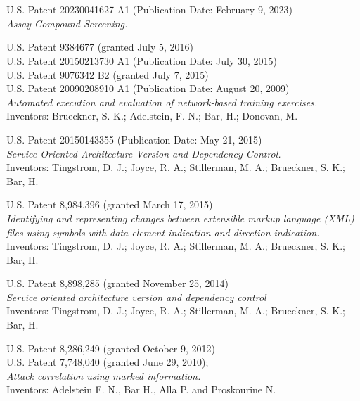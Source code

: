 \documentclass[12pt,a4paper]{article}
\newcommand{\headingfont}{\Large\color{OliveGreen}}
\newenvironment{list1}{
  \begin{list}{\ding{113}}{%
      \setlength{\itemsep}{0in}
      \setlength{\parsep}{0in} \setlength{\parskip}{0in}
      \setlength{\topsep}{0in} \setlength{\partopsep}{0in}
      \setlength{\leftmargin}{0.17in}}}{\end{list}}
\begin{document}
\section*{\sc{\headingfont Patents}}
\begin{list1}
\item[-] U.S. Patent 20230041627 A1 (Publication Date: February 9, 2023)\\
{\em Assay Compound Screening.}
\item[-] U.S. Patent 9384677 (granted July 5, 2016)\\
U.S. Patent 20150213730 A1 (Publication Date: July 30, 2015)\\
U.S. Patent 9076342 B2 (granted July 7, 2015)\\
U.S. Patent 20090208910 A1 (Publication Date: August 20, 2009)\\
{\em Automated execution and evaluation of network-based training exercises.}\\
Inventors: Brueckner, S. K.; Adelstein, F. N.; Bar, H.; Donovan, M.
\item[-] U.S. Patent 20150143355 (Publication Date: May 21, 2015)\\
{\em Service Oriented Architecture Version and Dependency Control.}\\
Inventors: Tingstrom, D. J.; Joyce, R. A.; Stillerman, M. A.; Brueckner, S. K.; Bar, H.
\item[-] U.S. Patent 8,984,396 (granted March 17, 2015)\\
{\em Identifying and representing changes between extensible markup language (XML) files using symbols with data element indication and direction indication.}\\
Inventors: Tingstrom, D. J.; Joyce, R. A.; Stillerman, M. A.; Brueckner, S. K.; Bar, H.
\item[-] U.S. Patent 8,898,285 (granted November 25, 2014)\\
{\em Service oriented architecture version and dependency control}\\
Inventors: Tingstrom, D. J.; Joyce, R. A.; Stillerman, M. A.; Brueckner, S. K.; Bar, H.
\item[-]  U.S. Patent 8,286,249 (granted October 9, 2012)\\
U.S. Patent 7,748,040 (granted June 29, 2010);\\
{\em Attack correlation using marked information.}\\
Inventors: Adelstein F. N., Bar H., Alla P. and Proskourine N.
\end{list1}
\end{document}
